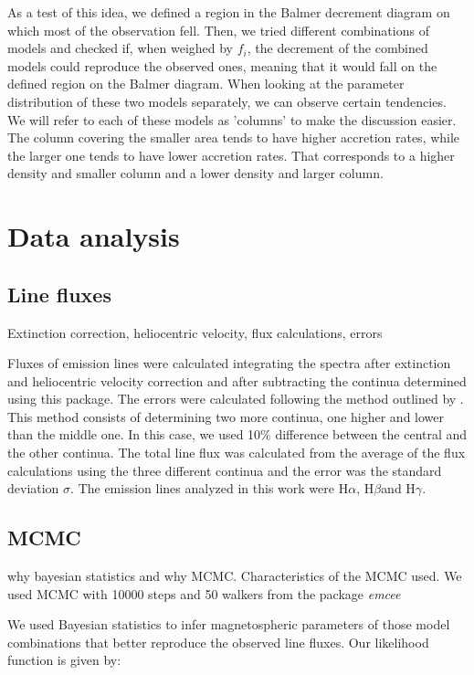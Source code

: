 \documentclass[twocolumn,linenumbers]{aastex631}
\newcommand{\halpha}{H$\alpha$}
\newcommand{\hbeta}{H$\beta$}
\newcommand{\hgamma}{H$\gamma$}
\begin{document}
As a test of this idea, we defined a region in the Balmer decrement diagram on which most of the observation fell. Then, we tried different combinations of models and checked if, when weighed by $f_i$, the decrement of the combined models could reproduce the observed ones, meaning that it would fall on the defined region on the Balmer diagram. When looking at the parameter distribution of these two models separately, we can observe certain tendencies. We will refer to each of these models as 'columns' to make the discussion easier. The column covering the smaller area tends to have higher accretion rates, while the larger one tends to have lower accretion rates. That corresponds to a higher density and smaller column and a lower density and larger column.

\section{Data analysis}

\subsection{Line fluxes}

Extinction correction, heliocentric velocity, flux calculations, errors

Fluxes of emission lines were calculated integrating the spectra after extinction and heliocentric velocity correction and after subtracting the continua determined using this package. The errors were calculated following the method outlined by \citet{alcala2014}. This method consists of determining two more continua, one higher and lower than the middle one. In this case, we used 10\% difference between the central and the other continua. The total line flux was calculated from the average of the flux calculations using the three different continua and the error was the standard deviation $\sigma$. The emission lines analyzed in this work were \halpha, \hbeta and \hgamma.


\subsection{MCMC}

why bayesian statistics and why MCMC. Characteristics of the MCMC used. 
We used MCMC with 10000 steps and 50 walkers from the package \textit{emcee}

We used Bayesian statistics to infer magnetospheric parameters of those model combinations that better reproduce the observed line fluxes. Our likelihood function is given by:
\end{document}
